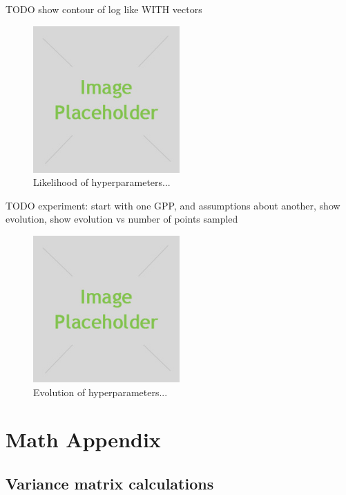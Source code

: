 \documentclass[phd,tocprelim]{cornell}
\begin{document}
TODO
show contour of log like WITH vectors
\begin{figure}[hpt]
 	\centerline{\includegraphics[width=0.5\textwidth]{figures/placeholder.jpg}}
    \caption[Likelihood of hyperparameters]{Likelihood of hyperparameters...}
 	\label{fig:EPI_hyper_1}
\end{figure}

TODO
experiment: start with one GPP, and assumptions about another, show evolution, show evolution vs number of points sampled
\begin{figure}[hpt]
 	\centerline{\includegraphics[width=0.5\textwidth]{figures/placeholder.jpg}}
    \caption[Evolution of hyperparameters]{Evolution of hyperparameters...}
 	\label{fig:EPI_hyper_2}
\end{figure}


\section{Math Appendix}

\subsection{Variance matrix calculations}
\end{document}
